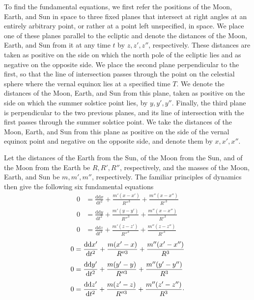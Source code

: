 \par\noindent\hspace*{\parindent}To find the fundamental equations, we first refer the
positions of the Moon, Earth, and Sun in space to three fixed
planes that intersect at right angles at an entirely arbitrary point, or rather
at a point left unspecified, in space. We place one
of these planes parallel to the ecliptic and denote the distances
of the Moon, Earth, and Sun from it at any time \(t\) by
\(z,z',z''\), respectively. These distances are taken as positive on the side on which
the north pole of the ecliptic lies and as negative on the opposite side. We place the
second plane perpendicular to the first, so that the
line of intersection passes through the point on the celestial sphere where the vernal equinox
lies at a specified time \(T\). We denote the distances of the Moon, Earth, and
Sun from this plane, taken as positive on the side on which the
summer solstice point lies, by \(y,y',y''\). Finally, the
third plane is perpendicular to the two previous planes, and its line of intersection
with the first passes through the summer solstice point. We take the distances of the
Moon, Earth, and Sun from this plane as positive on the side of the
vernal equinox point and negative on the opposite side,
and denote them by \(x,x',x''\).

\par\noindent\hspace*{\parindent}Let the distances of the Earth from the Sun, of the Moon from the
Sun, and of the Moon from the Earth be \(R,R',R''\), respectively, and the masses of the Moon,
Earth, and Sun be \(m,m',m''\), respectively. The familiar principles of
dynamics then give the following six fundamental equations
\[
\begin{aligned}
0&=\frac{\mathrm{dd}x}{\mathrm{d}t^2}
  +\frac{m'(x-x')}{R''^3}+\frac{m''(x-x'')}{R'^3}\\[4pt]
0&=\frac{\mathrm{dd}y}{\mathrm{d}t^2}
  +\frac{m'(y-y')}{R''^3}+\frac{m''(x-x'')}{R'^3}\\[4pt]
0&=\frac{\mathrm{dd}z}{\mathrm{d}t^2}
  +\frac{m'(z-z')}{R''^3}+\frac{m''(z-z'')}{R'^3}
\end{aligned}
\]
\[
\begin{aligned}
0&=\frac{\mathrm{dd}x'}{\mathrm{d}t^2}
  +\frac{m(x'-x)}{R''^3}+\frac{m''(x'-x'')}{R^3}\\[4pt]
0&=\frac{\mathrm{dd}y'}{\mathrm{d}t^2}
  +\frac{m(y'-y)}{R''^3}+\frac{m''(y'-y'')}{R^3}\\[4pt]
0&=\frac{\mathrm{dd}z'}{\mathrm{d}t^2}
  +\frac{m(z'-z)}{R''^3}+\frac{m''(z'-z'')}{R^3}
  \mathpunct{\raisebox{.4ex}{.}}
\end{aligned}
\]
\clearpage
\endgroup
